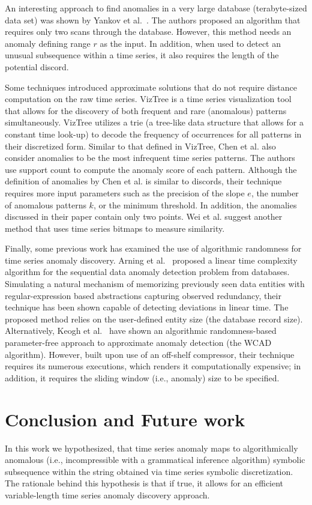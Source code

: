 \documentclass{sig-alternate}
\begin{document}
An interesting approach to find anomalies in a very large database (terabyte-sized data set) was shown by Yankov et al.~\cite{disk}. The authors proposed an algorithm that requires only two scans through the database. However, this method needs an anomaly defining range $r$ as the input. In addition, when used to detect an unusual subsequence within a time series, it also requires the length of the potential discord. 

Some techniques introduced approximate solutions that do not require distance computation on the raw time series. VizTree \cite{viztree} is a time series visualization tool that allows for the discovery of both frequent and rare (anomalous) patterns simultaneously. VizTree utilizes a trie (a tree-like data structure that allows for a constant time look-up) to decode the frequency of occurrences for all patterns in their discretized form. Similar to that defined in VizTree, Chen et al.\cite{ano_pattern} also consider anomalies to be the most infrequent time series patterns. The authors use support count to compute the anomaly score of each pattern. Although the definition of anomalies by Chen et al. is similar to discords, their technique requires more input parameters such as the precision of the slope $e$, the number of anomalous patterns $k$, or the minimum threshold. In addition, the anomalies discussed in their paper contain only two points. Wei et al. \cite{bitmaps} suggest another method that uses time series bitmaps to measure similarity. 

Finally, some previous work has examined the use of algorithmic randomness for time series anomaly discovery. Arning et al.~\cite{regex} proposed a linear time complexity algorithm for the sequential data anomaly detection problem from databases. Simulating a natural mechanism of memorizing previously seen data entities with regular-expression based abstractions capturing observed redundancy, their technique has been shown capable of detecting deviations in linear time. The proposed method relies on the user-defined entity size (the database record size). Alternatively, Keogh et al.~\cite{param_free} have shown an algorithmic randomness-based para\-meter-free approach to approximate anomaly detection (the WCAD algorithm). However, built upon use of an off-shelf compressor, their technique requires its numerous executions, which renders it computationally expensive; in addition, it requires the sliding window (i.e., anomaly) size to be specified.

\section{Conclusion and Future work}
In this work we hypothesized, that time series anomaly maps to algorithmically anomalous (i.e., incompressible with a grammatical inference algorithm) symbolic subsequence within the string obtained via time series symbolic discretization. The rationale behind this hypothesis is that if true, it allows for an efficient variable-length time series anomaly discovery approach.
\end{document}
